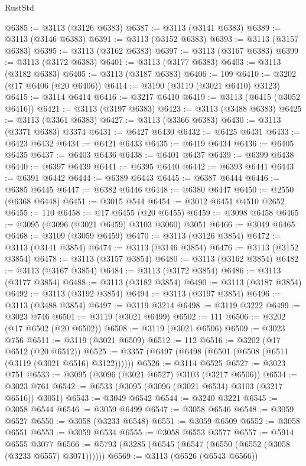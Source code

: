 \begin{lexlean}{RustStd}
\begin{coremodule}
@6385 := @3113 (@3126 @6383)
@6387 := @3113 (@3141 @6383)
@6389 := @3113 (@3146 @6383)
@6391 := @3113 (@3152 @6383)
@6393 := @3113 (@3157 @6383)
@6395 := @3113 (@3162 @6383)
@6397 := @3113 (@3167 @6383)
@6399 := @3113 (@3172 @6383)
@6401 := @3113 (@3177 @6383)
@6403 := @3113 (@3182 @6383)
@6405 := @3113 (@3187 @6383)
@6406 := 109
@6410 := @3202 (@17 @6406 (@20 @6406))
@6414 := @3190 (@3119 (@3021 @6410) @3123)
@6415 := @3114 @6414
@6416 := @3217 @6410
@6419 := @3113 (@6415 (@3052 @6416))
@6421 := @3113 (@3197 @6383)
@6423 := @3113 (@3488 @6383)
@6425 := @3113 (@3361 @6383)
@6427 := @3113 (@3366 @6383)
@6430 := @3113 (@3371 @6383) @3374
@6431 := @6427 @6430
@6432 := @6425 @6431
@6433 := @6423 @6432
@6434 := @6421 @6433
@6435 := @6419 @6434
@6436 := @6405 @6435
@6437 := @6403 @6436
@6438 := @6401 @6437
@6439 := @6399 @6438
@6440 := @6397 @6439
@6441 := @6395 @6440
@6442 := @6393 @6441
@6443 := @6391 @6442
@6444 := @6389 @6443
@6445 := @6387 @6444
@6446 := @6385 @6445
@6447 := @6382 @6446
@6448 := @6380 @6447
@6450 := @2550 (@6368 @6448)
@6451 := @3015 @544
@6454 := @3012 @6451 @4510 @2652
@6455 := 110
@6458 := @17 @6455 (@20 @6455)
@6459 := @3098 @6458
@6465 := @3095 (@3096 (@3021 @6459) @3103 @3060) @3051
@6466 := @3049 @6465
@6468 := @3109 (@3059 @6459)
@6470 := @3113 (@3126 @3854)
@6472 := @3113 (@3141 @3854)
@6474 := @3113 (@3146 @3854)
@6476 := @3113 (@3152 @3854)
@6478 := @3113 (@3157 @3854)
@6480 := @3113 (@3162 @3854)
@6482 := @3113 (@3167 @3854)
@6484 := @3113 (@3172 @3854)
@6486 := @3113 (@3177 @3854)
@6488 := @3113 (@3182 @3854)
@6490 := @3113 (@3187 @3854)
@6492 := @3113 (@3192 @3854)
@6494 := @3113 (@3197 @3854)
@6496 := @3113 (@3488 @3854)
@6497 := @3119 @3214
@6498 := @3119 @3222
@6499 := @3023 @746
@6501 := @3119 (@3021 @6499)
@6502 := 111
@6506 := @3202 (@17 @6502 (@20 @6502))
@6508 := @3119 (@3021 @6506)
@6509 := @3023 @756
@6511 := @3119 (@3021 @6509)
@6512 := 112
@6516 := @3202 (@17 @6512 (@20 @6512))
@6525 := @3357 (@6497 (@6498 (@6501 (@6508 (@6511 (@3119 (@3021 @6516) @3122))))))
@6526 := @3114 @6525
@6527 := @3023 @751
@6533 := @3095 (@3096 (@3021 @6527) @3103 (@3217 @6506))
@6534 := @3023 @761
@6542 := @6533 (@3095 (@3096 (@3021 @6534) @3103 (@3217 @6516)) @3051)
@6543 := @3049 @6542
@6544 := @3240 @3221
@6545 := @3058 @6544
@6546 := @3059 @6499
@6547 := @3058 @6546
@6548 := @3059 @6527
@6550 := @3058 (@3233 @6548)
@6551 := @3059 @6509
@6552 := @3058 @6551
@6553 := @3059 @6534
@6555 := @3058 @6553 @3577
@6557 := @5914 @6555 @3077
@6566 := @5793 (@3285 (@6545 (@6547 (@6550 (@6552 (@3058 (@3233 @6557) @3071))))))
@6569 := @3113 (@6526 (@6543 @6566))

\end{coremodule}
\end{lexlean}

